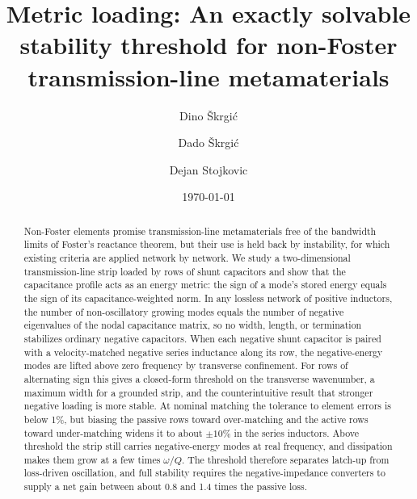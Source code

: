 \documentclass[aps,prapplied,twocolumn,superscriptaddress,floatfix,longbibliography]{revtex4-2}
\begin{document}
\title{Metric loading: An exactly solvable stability threshold for non-Foster transmission-line metamaterials}

\author{Dino \v{S}krgi\'c}
\author{Dado \v{S}krgi\'c}
\author{Dejan Stojkovic}

\date{\today}

\begin{abstract}
Non-Foster elements promise transmission-line metamaterials free of the bandwidth limits of Foster's reactance theorem, but their use is held back by instability, for which existing criteria are applied network by network. We study a two-dimensional transmission-line strip loaded by rows of shunt capacitors and show that the capacitance profile acts as an energy metric: the sign of a mode's stored energy equals the sign of its capacitance-weighted norm. In any lossless network of positive inductors, the number of non-oscillatory growing modes equals the number of negative eigenvalues of the nodal capacitance matrix, so no width, length, or termination stabilizes ordinary negative capacitors. When each negative shunt capacitor is paired with a velocity-matched negative series inductance along its row, the negative-energy modes are lifted above zero frequency by transverse confinement. For rows of alternating sign this gives a closed-form threshold on the transverse wavenumber, a maximum width for a grounded strip, and the counterintuitive result that stronger negative loading is more stable. At nominal matching the tolerance to element errors is below 1\%, but biasing the passive rows toward over-matching and the active rows toward under-matching widens it to about $\pm10\%$ in the series inductors. Above threshold the strip still carries negative-energy modes at real frequency, and dissipation makes them grow at a few times $\omega/Q$. The threshold therefore separates latch-up from loss-driven oscillation, and full stability requires the negative-impedance converters to supply a net gain between about 0.8 and 1.4 times the passive loss.
\end{abstract}

\maketitle
\end{document}

